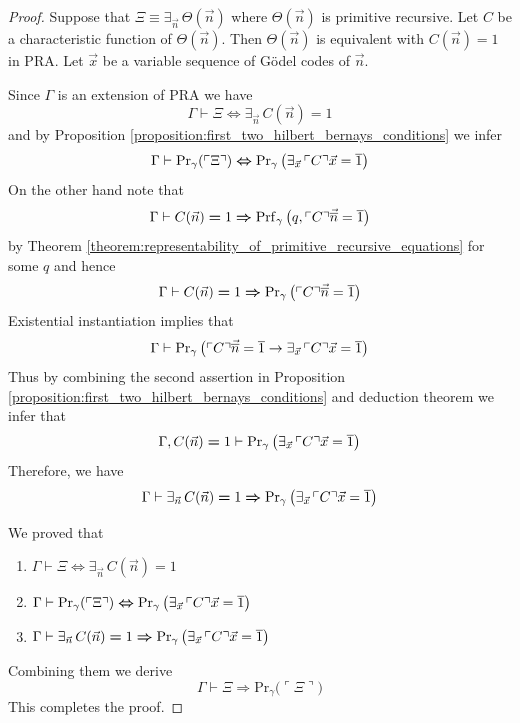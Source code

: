 \documentclass[10pt]{amsart}
\newcommand{\godel}[1]{\ulcorner #1 \urcorner}
\newcommand{\mexists}{\boldsymbol{\exists}}
\newcommand{\mra}{\boldsymbol{\Rightarrow}}
\newcommand{\mequiv}{\boldsymbol{\Leftrightarrow}}
\newcommand{\meq}{\boldsymbol{=}}
\begin{document}
\begin{proof}
  Suppose that $\Xi \equiv \mexists_{\vec{n}}\,\Theta(\vec{n})$ where $\Theta(\vec{n})$ is primitive recursive. Let $C$ be a characteristic function of $\Theta(\vec{n})$. Then $\Theta(\vec{n})$ is equivalent with $C(\vec{n}) \meq 1$ in $\mathrm{PRA}$. Let $\vec{x}$ be a variable sequence of G{\"o}del codes of $\vec{n}$. 

  Since $\Gamma$ is an extension of $\mathrm{PRA}$ we have 
	$$\Gamma \vdash \Xi \mequiv \mexists_{\vec{n}}\,C(\vec{n}) \meq 1$$
  and by Proposition \ref{proposition:first_two_hilbert_bernays_conditions} we infer
$$\Gamma \vdash \mathrm{Pr}_{\gamma}(\godel{\Xi}) \mequiv \mathrm{Pr}_{\gamma}\left(\exists_{\vec{x}}\,\godel{C}\vec{x} = \ol{1}\right)$$
  On the other hand note that
  $$\Gamma \vdash C(\vec{n}) \meq 1 \mra \mathrm{Prf}_{\gamma}\left(q,\godel{C}\vec{\ol{n}} = \ol{1}\right)$$
  by Theorem \ref{theorem:representability_of_primitive_recursive_equations} for some $q$ and hence
  $$\Gamma \vdash C(\vec{n}) \meq 1 \mra \mathrm{Pr}_{\gamma}\left(\godel{C}\vec{\ol{n}} = \ol{1}\right)$$
  Existential instantiation implies that
	$$\Gamma \vdash \mathrm{Pr}_{\gamma}\left(\godel{C}\vec{\ol{n}} = \ol{1} \ra \exists_{\vec{x}}\,\godel{C}\vec{x} = \ol{1}\right)$$
  Thus by combining the second assertion in Proposition \ref{proposition:first_two_hilbert_bernays_conditions} and deduction theorem we infer that
  $$\Gamma, C(\vec{n}) \meq 1 \vdash \mathrm{Pr}_{\gamma}\left(\exists_{\vec{x}}\,\godel{C}\vec{x} = \ol{1}\right)$$
  Therefore, we have
  $$\Gamma \vdash \exists_{\vec{n}}\,C(\vec{n}) \meq 1 \mra \mathrm{Pr}_{\gamma}\left(\exists_{\vec{x}}\,\godel{C}\vec{x} = \ol{1}\right)$$
  
  We proved that
  \begin{enumerate}[label=\textbf{\arabic*.}, leftmargin=3.0em]
    \item $\Gamma \vdash \Xi \mequiv \mexists_{\vec{n}}\,C(\vec{n}) \meq 1$
    \item $\Gamma \vdash \mathrm{Pr}_{\gamma}(\godel{\Xi}) \mequiv \mathrm{Pr}_{\gamma}\left(\exists_{\vec{x}}\,\godel{C}\vec{x} = \ol{1}\right)$
    \item $\Gamma \vdash \exists_{\vec{n}}\,C(\vec{n}) \meq 1 \mra \mathrm{Pr}_{\gamma}\left(\exists_{\vec{x}}\,\godel{C}\vec{x} = \ol{1}\right)$
\end{enumerate}
  Combining them we derive
	$$\Gamma \vdash \Xi \mra \mathrm{Pr}_{\gamma}\bigg(\godel{\Xi}\bigg)$$
  This completes the proof.
\end{proof}
\end{document}
